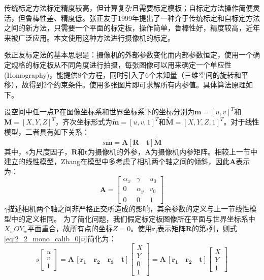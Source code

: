 传统标定方法标定精度较高，但计算复杂且需要标定模板；自标定方法操作简便灵活，但鲁棒性差、精度低。张正友于1999年提出了一种介于传统标定和自标定方法之间的新方法\cite{zhang1999flexible}，只需要一个平面的标定板，操作简单，鲁棒性好，精度较高，近年来被广泛应用。本文使用这种方法进行摄像机的标定。

张正友标定法的基本思想是：摄像机的外部参数变化而内部参数恒定，使用一个确定规格的标定板从不同角度进行拍摄，每张图像可以用来确定一个单应性(Homography)，能提供8个方程，同时引入了6个未知量（三维空间的旋转和平移），故得到2个约束条件。使用多张图片即可求解所有内参值。具体算法原理如下。


设空间中任一点$\mathbf{P}$在图像坐标系和世界坐标系下的坐标分别为$\mathbf{m}=[u,v]^T$和$\mathbf{M}=[X, Y, Z]^T$，齐次坐标形式为$\tilde{\mathbf{m}} = [u,v,1]^T$和$\tilde{\mathbf{M}} = [X,Y,Z,1]^T$。对于线性模型，二者具有如下关系：
%
\begin{equation}\label{eq:2_2_mono_calib_0}
s \tilde{\mathbf{m}} = \mathbf{A} [ \mathbf{R}  \quad  \mathbf{t} ] \tilde{\mathbf{M}}
\end{equation}
其中，$s$为尺度因子，$\mathbf{R}$和$\mathbf{t}$为摄像机的外参，$\mathbf{A}$为摄像机内参矩阵。相较上一节中建立的线性模型，Zhang\cite{zhang2000flexible}在模型中多考虑了相机两个轴之间的倾斜，因此$\mathbf{A}$表示为：
%
\begin{equation}\label{eq:2_2_mono_calib_1}
\mathbf{A}=
\left[ \begin{array}{ccc}
\alpha_x & \gamma & u_0 \\
0 & \alpha_y & v_0 \\
0 & 0 & 1
\end{array} \right]
\end{equation}
$\gamma$描述相机两个轴之间非严格正交所造成的影响，其余参数的定义与上一节线性模型中的定义相同。
为了简化问题，我们假定标定板图像所在平面与世界坐标系中$X_wOY_w$平面重合，故所有点的坐标$Z=0$。使用$\mathbf{r_i}$表示矩阵$\mathbf{R}$的第$i$列，则式\ref{eq:2_2_mono_calib_0}可简化为：
%
\begin{equation}\label{eq:2_2_mono_calib_2}
s
\begin{bmatrix}
u \\ v \\ 1
\end{bmatrix}
= \mathbf{A} \hspace{2pt}  [ \mathbf{r_1} \quad \mathbf{r_2} \quad \mathbf{r_3} \quad \mathbf{t} ]
\begin{bmatrix}
X \\ Y \\ 0 \\ 1
\end{bmatrix}
= \mathbf{A} \hspace{2pt}  [ \mathbf{r_1} \quad\mathbf{r_2} \quad \mathbf{t} ]
\begin{bmatrix}
X \\ Y \\ 1
\end{bmatrix}
\end{equation}

